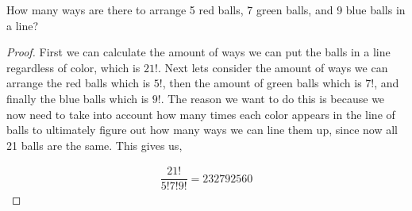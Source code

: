 \documentclass[11pt]{article}
\newenvironment{problem}[2][Problem\!]{\begin{trivlist}
\item[\hskip \labelsep {\bfseries #1}\hskip \labelsep {\bfseries #2}]}{\end{trivlist}}
\begin{document}
\begin{tcolorbox}
    \begin{problem} {OC | 11/01 | 71.}
        How many ways are there to arrange 5 red balls, 7 green balls, and 9 blue balls in a line?
    \end{problem}
\end{tcolorbox}
\begin{proof}
    First we can calculate the amount of ways we can put the balls in a line regardless of color, which is $21!$. Next lets consider the amount of ways we can arrange the red balls which is $5!$, then the amount of green balls which is $7!$, and finally the blue balls which is $9!$. The reason we want to do this is because we now need to take into account how many times each color appears in the line of balls to ultimately figure out how many ways we can line them up, since now all 21 balls are the same. This gives us,

    \begin{align*}
        \dfrac{21!}{5!7!9!} = 232792560
    \end{align*}
\end{proof}
\newpage 
\end{document}
